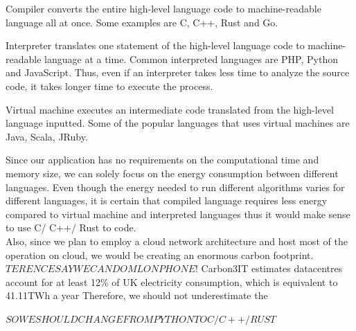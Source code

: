 \begin{description}
    \item Compiler converts the entire high-level language code to machine-readable language all at once. Some examples are C, C++, Rust and Go. 
    \item Interpreter translates one statement of the high-level language code to machine-readable language at a time. Common interpreted languages are PHP, Python and JavaScript.
    Thus, even if an interpreter takes less time to analyze the source code, it takes longer time to execute the process.
    \item Virtual machine executes an intermediate code translated from the high-level language inputted. Some of the popular languages that uses virtual machines are Java, Scala, JRuby.
\end{description}

Since our application has no requirements on the computational time and memory size, we can solely focus on the energy consumption between 
different languages. Even though the energy needed to run different algorithms varies for different languages, it is certain that
compiled language requires less energy compared to virtual machine and interpreted languages thus it would make sense to use C/ C++/ Rust to code.\\
Also, since we plan to employ a cloud network architecture and host most of the operation on cloud, we would be creating an enormous carbon footprint. $TERENCE SAY WE CAN DO ML ON PHONE!$
Carbon3IT estimates datacentres account for at least 12\% of UK electricity consumption, which is equivalent to 41.11TWh a year \cite{carbon}
Therefore, we should not underestimate the 


$SO WE SHOULD CHANGE FROM PYTHON TO C/C++/RUST$
